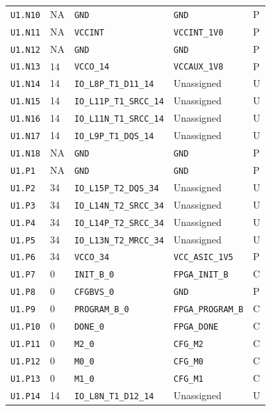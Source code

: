 \documentclass[11pt,a4paper]{article}
\begin{document}
\begin{longtable}{@{}P{20mm}P{10mm}P{70mm}P{51mm}P{11mm}@{}}
\nolinkurl{U1.N10} & NA & \nolinkurl{GND} & \nolinkurl{GND} & P \\
\nolinkurl{U1.N11} & NA & \nolinkurl{VCCINT} & \nolinkurl{VCCINT_1V0} & P \\
\nolinkurl{U1.N12} & NA & \nolinkurl{GND} & \nolinkurl{GND} & P \\
\nolinkurl{U1.N13} & 14 & \nolinkurl{VCCO_14} & \nolinkurl{VCCAUX_1V8} & P \\
\nolinkurl{U1.N14} & 14 & \nolinkurl{IO_L8P_T1_D11_14} & Unassigned & U \\
\nolinkurl{U1.N15} & 14 & \nolinkurl{IO_L11P_T1_SRCC_14} & Unassigned & U \\
\nolinkurl{U1.N16} & 14 & \nolinkurl{IO_L11N_T1_SRCC_14} & Unassigned & U \\
\nolinkurl{U1.N17} & 14 & \nolinkurl{IO_L9P_T1_DQS_14} & Unassigned & U \\
\nolinkurl{U1.N18} & NA & \nolinkurl{GND} & \nolinkurl{GND} & P \\
\nolinkurl{U1.P1} & NA & \nolinkurl{GND} & \nolinkurl{GND} & P \\
\nolinkurl{U1.P2} & 34 & \nolinkurl{IO_L15P_T2_DQS_34} & Unassigned & U \\
\nolinkurl{U1.P3} & 34 & \nolinkurl{IO_L14N_T2_SRCC_34} & Unassigned & U \\
\nolinkurl{U1.P4} & 34 & \nolinkurl{IO_L14P_T2_SRCC_34} & Unassigned & U \\
\nolinkurl{U1.P5} & 34 & \nolinkurl{IO_L13N_T2_MRCC_34} & Unassigned & U \\
\nolinkurl{U1.P6} & 34 & \nolinkurl{VCCO_34} & \nolinkurl{VCC_ASIC_1V5} & P \\
\nolinkurl{U1.P7} & 0 & \nolinkurl{INIT_B_0} & \nolinkurl{FPGA_INIT_B} & C \\
\nolinkurl{U1.P8} & 0 & \nolinkurl{CFGBVS_0} & \nolinkurl{GND} & P \\
\nolinkurl{U1.P9} & 0 & \nolinkurl{PROGRAM_B_0} & \nolinkurl{FPGA_PROGRAM_B} & C \\
\nolinkurl{U1.P10} & 0 & \nolinkurl{DONE_0} & \nolinkurl{FPGA_DONE} & C \\
\nolinkurl{U1.P11} & 0 & \nolinkurl{M2_0} & \nolinkurl{CFG_M2} & C \\
\nolinkurl{U1.P12} & 0 & \nolinkurl{M0_0} & \nolinkurl{CFG_M0} & C \\
\nolinkurl{U1.P13} & 0 & \nolinkurl{M1_0} & \nolinkurl{CFG_M1} & C \\
\nolinkurl{U1.P14} & 14 & \nolinkurl{IO_L8N_T1_D12_14} & Unassigned & U \\

\end{longtable}
\end{document}
